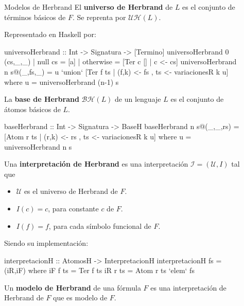 \documentclass[final]{beamer}
\newlength{\sepwid}
\newlength{\onecolwid}
\newlength{\twocolwid}
\begin{document}
\begin{frame}[t,fragile]
\begin{columns}[t]
\begin{column}{\twocolwid}
\begin{columns}[t,totalwidth=\twocolwid]
\begin{column}{\onecolwid}
\end{column} %

\end{columns} %

\end{column} %

\begin{column}{\sepwid}\end{column} %

\begin{column}{\onecolwid} %

  
\begin{block}{Modelos de Herbrand}
El \textbf{universo de Herbrand} de $L$ es el conjunto de términos básicos de
 $F$. Se reprenta por $\mathcal{UH}(L)$.

 Representado en Haskell por:
  
\begin{code}
universoHerbrand :: Int -> Signatura -> [Termino]
universoHerbrand 0 (cs,_,_) 
  | null cs   = [a]
  | otherwise = [Ter c [] | c <- cs]
universoHerbrand n s@(_,fs,_) =
  u `union`
  [Ter f ts | (f,k) <- fs
            , ts <- variacionesR k u]
  where u = universoHerbrand (n-1) s 
\end{code}


La \textbf{base de Herbrand} $\mathcal{BH}(L)$ de un lenguaje $L$ es el
conjunto de átomos básicos de $L$.


\begin{code}
baseHerbrand :: Int -> Signatura -> BaseH
baseHerbrand n s@(_,_,rs) =
  [Atom r ts | (r,k) <- rs
             , ts <- variacionesR k u]
  where u = universoHerbrand n s
\end{code}

   Una \textbf{interpretación de Herbrand} es una interpretación
  $\mathcal{I} = (\mathcal{U},I)$ tal que
  \begin{itemize}
  \item $\mathcal{U}$ es el universo de Herbrand de $F$.
  \item $I(c) = c$, para constante $c$ de $F$.
  \item $I(f) = f$, para cada símbolo funcional de $F$.
  \end{itemize}
Siendo su implementación:  
  \begin{code}
    interpretacionH :: AtomosH -> InterpretacionH
interpretacionH fs = (iR,iF)
  where iF f ts   = Ter  f ts
        iR r ts   = Atom r ts `elem` fs
  \end{code}
Un \textbf{modelo de Herbrand} de una fórmula $F$ es una interpretación de
Herbrand de $F$ que es modelo de $F$.
  

\end{block}
\end{column}
\end{columns}
\end{frame}
\end{document}
